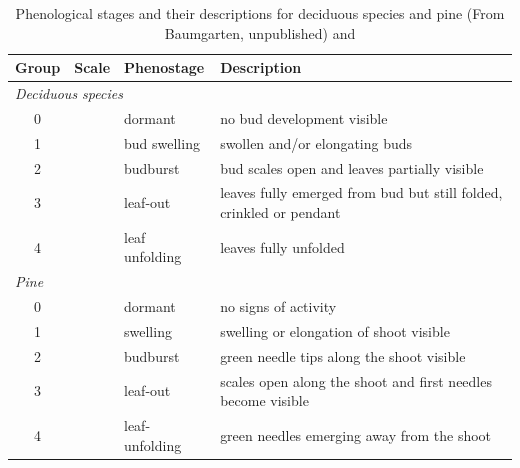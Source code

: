 \documentclass{article}
\begin{document}
\begin{table}[h!]
\centering
\caption{Phenological stages and their descriptions for deciduous species and pine (From Baumgarten, unpublished) and \citep{vitasse_ontogenic_2013}}
\renewcommand{\arraystretch}{1.2}
\begin{tabular}{cllp{8cm}}
\hline
\textbf{Group} & \textbf{Scale} & \textbf{Phenostage} & \textbf{Description} \\
\hline

\multicolumn{4}{l}{\textit{Deciduous species}} \\
0 &  & dormant & no bud development visible \\
1 &  & bud swelling & swollen and/or elongating buds \\
2 &  & budburst & bud scales open and leaves partially visible \\
3 &  & leaf-out & leaves fully emerged from bud but still folded, crinkled or pendant \\
4 &  & leaf unfolding & leaves fully unfolded \\

\hline
\multicolumn{4}{l}{\textit{Pine}} \\
0 &  & dormant & no signs of activity \\
1 &  & swelling & swelling or elongation of shoot visible \\
2 &  & budburst & green needle tips along the shoot visible \\
3 &  & leaf-out & scales open along the shoot and first needles become visible \\
4 &  & leaf-unfolding & green needles emerging away from the shoot \\

\hline
\end{tabular}
\label{tab:phenostages}
\end{table}
\end{document}
